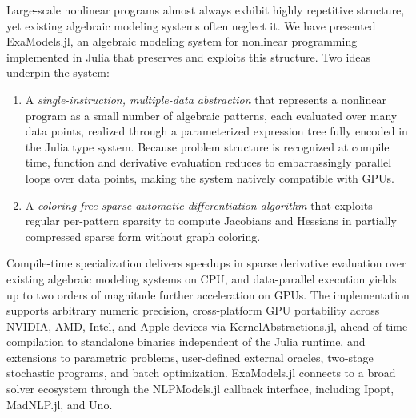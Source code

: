 \documentclass[11pt]{article}
\begin{document}
Large-scale nonlinear programs almost always exhibit highly repetitive structure, yet existing algebraic modeling systems often neglect it. We have presented ExaModels.jl, an algebraic modeling system for nonlinear programming implemented in Julia that preserves and exploits this structure. Two ideas underpin the system:
\begin{enumerate}
  \item A \emph{single-instruction, multiple-data abstraction} that represents a nonlinear program as a small number of algebraic patterns, each evaluated over many data points, realized through a parameterized expression tree fully encoded in the Julia type system. Because problem structure is recognized at compile time, function and derivative evaluation reduces to embarrassingly parallel loops over data points, making the system natively compatible with GPUs.
  \item A \emph{coloring-free sparse automatic differentiation algorithm} that exploits regular per-pattern sparsity to compute Jacobians and Hessians in partially compressed sparse form without graph coloring.
\end{enumerate}
Compile-time specialization delivers speedups in sparse derivative evaluation over existing algebraic modeling systems on CPU, and data-parallel execution yields up to two orders of magnitude further acceleration on GPUs. The implementation supports arbitrary numeric precision, cross-platform GPU portability across NVIDIA, AMD, Intel, and Apple devices via KernelAbstractions.jl, ahead-of-time compilation to standalone binaries independent of the Julia runtime, and extensions to parametric problems, user-defined external oracles, two-stage stochastic programs, and batch optimization. ExaModels.jl connects to a broad solver ecosystem through the NLPModels.jl callback interface, including Ipopt, MadNLP.jl, and Uno.
\end{document}
